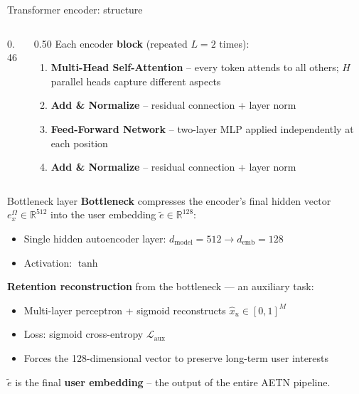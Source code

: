 \documentclass[aspectratio=169,t]{beamer}
\begin{document}
\begin{frame}{Transformer encoder: structure}
\begin{columns}[T]
\begin{column}{0.46\textwidth}
\begin{center}
      \end{center}
    \end{column}
    \begin{column}{0.50\textwidth}
      \vspace{0.4cm}
      Each encoder \textbf{block} (repeated $L=2$ times):
      \vspace{0.2cm}
      \begin{enumerate}
        \item \textbf{Multi-Head Self-Attention} -- every token attends to all others; $H$ parallel heads capture different aspects
        \item \textbf{Add \& Normalize} -- residual connection + layer norm
        \item \textbf{Feed-Forward Network} -- two-layer MLP applied independently at each position
        \item \textbf{Add \& Normalize} -- residual connection + layer norm
      \end{enumerate}
    \end{column}
  \end{columns}
\end{frame}

\begin{frame}{Bottleneck layer}
    \textbf{Bottleneck} compresses the encoder's final hidden vector $e_x^\Omega \in \mathbb{R}^{512}$ into the user embedding $\tilde{e} \in \mathbb{R}^{128}$:
    \begin{itemize}
      \item Single hidden autoencoder layer: $d_\text{model} = 512 \to d_\text{emb} = 128$
      \item Activation: $\tanh$
    \end{itemize}
    \vspace{0.35cm}
    \textbf{Retention reconstruction} from the bottleneck — an auxiliary task:
    \begin{itemize}
      \item Multi-layer perceptron + sigmoid reconstructs $\hat{x}_u \in [0,1]^M$
      \item Loss: sigmoid cross-entropy $\mathcal{L}_\text{aux}$
      \item Forces the 128-dimensional vector to preserve long-term user interests
    \end{itemize}
    \vspace{0.35cm}
    \begin{block}{}
      $\tilde{e}$ is the final \textbf{user embedding} -- the output of the entire AETN pipeline.
    \end{block}
  \end{frame}
\end{document}
